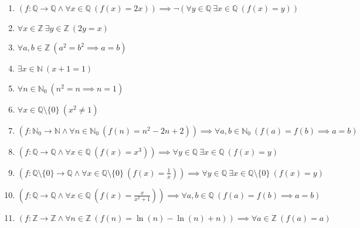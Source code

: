 \documentclass[11pt,a4paper]{article}
\begin{document}
\begin{enumerate}
\item $\displaystyle (f \colon \mathbb{Q} \to \mathbb{Q} \land \forall x \in \mathbb{Q}\ (f(x) = 2x)) \implies \lnot (\forall y \in \mathbb{Q}\ \exists x \in \mathbb{Q}\ (f(x) = y))$
\item $\displaystyle \forall x \in \mathbb{Z}\ \exists y \in \mathbb{Z}\ (2y = x)$
\item $\displaystyle \forall a, b \in \mathbb{Z}\ (a^{2} = b^{2} \implies a = b)$
\item $\displaystyle \exists x \in \mathbb{N}\ (x + 1 = 1)$
\item $\displaystyle \forall n \in \mathbb{N}_{0}\ (n^{2} = n \implies n = 1)$
\item $\displaystyle \forall x \in \mathbb{Q} \setminus \{0\}\ (x^{2} \neq 1)$
\item $\displaystyle (f \colon \mathbb{N}_{0} \to \mathbb{N} \land \forall n \in \mathbb{N}_{0}\ (f(n) = n^{2} - 2n + 2)) \implies \forall a, b \in \mathbb{N}_{0}\ (f(a) = f(b) \implies a = b)$
\item $\displaystyle (f \colon \mathbb{Q} \to \mathbb{Q} \land \forall x \in \mathbb{Q}\ (f(x) = x^{3})) \implies \forall y \in \mathbb{Q}\ \exists x \in \mathbb{Q}\ (f(x) = y)$
\item $\displaystyle (f \colon \mathbb{Q} \setminus \{0\} \to \mathbb{Q} \land \forall x \in \mathbb{Q} \setminus \{0\}\ (f(x) = \frac{1}{x})) \implies \forall y \in \mathbb{Q}\ \exists x \in \mathbb{Q} \setminus \{0\}\ (f(x) = y)$
\item $\displaystyle (f \colon \mathbb{Q} \to \mathbb{Q} \land \forall x \in \mathbb{Q}\ (f(x) = \frac{x}{x^{2} + 1})) \implies \forall a, b \in \mathbb{Q}\ (f(a) = f(b) \implies a = b)$
\item $\displaystyle (f \colon \mathbb{Z} \to \mathbb{Z} \land \forall n \in \mathbb{Z}\ (f(n) = \ln\left(n\right) - \ln\left(n\right) + n)) \implies \forall a \in \mathbb{Z}\ (f(a) = a)$
\end{enumerate}
\end{document}
